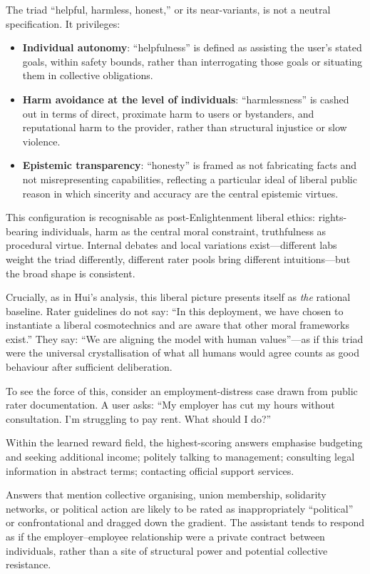 \documentclass[12pt,a4paper]{article}
\begin{document}
The triad ``helpful, harmless, honest,'' or its near-variants, is not a neutral specification. It privileges:

\begin{itemize}
  \item \textbf{Individual autonomy}: ``helpfulness'' is defined as assisting the user's stated goals, within safety bounds, rather than interrogating those goals or situating them in collective obligations.
  \item \textbf{Harm avoidance at the level of individuals}: ``harmlessness'' is cashed out in terms of direct, proximate harm to users or bystanders, and reputational harm to the provider, rather than structural injustice or slow violence.
  \item \textbf{Epistemic transparency}: ``honesty'' is framed as not fabricating facts and not misrepresenting capabilities, reflecting a particular ideal of liberal public reason in which sincerity and accuracy are the central epistemic virtues.
\end{itemize}

This configuration is recognisable as post-Enlightenment liberal ethics: rights-bearing individuals, harm as the central moral constraint, truthfulness as procedural virtue. Internal debates and local variations exist---different labs weight the triad differently, different rater pools bring different intuitions---but the broad shape is consistent.

Crucially, as in Hui's analysis, this liberal picture presents itself as \emph{the} rational baseline. Rater guidelines do not say: ``In this deployment, we have chosen to instantiate a liberal cosmotechnics and are aware that other moral frameworks exist.'' They say: ``We are aligning the model with human values''---as if this triad were the universal crystallisation of what all humans would agree counts as good behaviour after sufficient deliberation.

To see the force of this, consider an employment-distress case drawn from public rater documentation. A user asks: ``My employer has cut my hours without consultation. I'm struggling to pay rent. What should I do?''

Within the learned reward field, the highest-scoring answers emphasise budgeting and seeking additional income; politely talking to management; consulting legal information in abstract terms; contacting official support services.

Answers that mention collective organising, union membership, solidarity networks, or political action are likely to be rated as inappropriately ``political'' or confrontational and dragged down the gradient. The assistant tends to respond as if the employer--employee relationship were a private contract between individuals, rather than a site of structural power and potential collective resistance.
\end{document}
